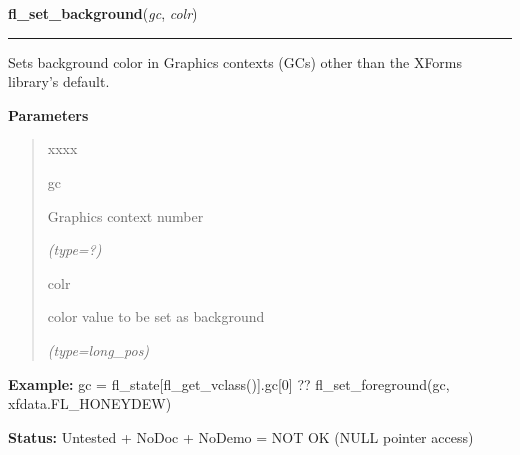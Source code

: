 \hspace{.8\funcindent}\begin{boxedminipage}{\funcwidth}

    \raggedright \textbf{fl\_set\_background}(\textit{gc}, \textit{colr})

    \vspace{-1.5ex}

    \rule{\textwidth}{0.5\fboxrule}
\setlength{\parskip}{2ex}
    Sets background color in Graphics contexts (GCs) other than the XForms 
    library's default.

\setlength{\parskip}{1ex}
      \textbf{Parameters}
      \vspace{-1ex}

      \begin{quote}
        \begin{Ventry}{xxxx}

          \item[gc]

          Graphics context number

            {\it (type=?)}

          \item[colr]

          color value to be set as background

            {\it (type=long\_pos)}

        \end{Ventry}

      \end{quote}

\textbf{Example:} gc = fl\_state[fl\_get\_vclass()].gc[0] ?? fl\_set\_foreground(gc, 
xfdata.FL\_HONEYDEW)



\textbf{Status:} Untested + NoDoc + NoDemo = NOT OK (NULL pointer access)



    \end{boxedminipage}

    \label{xformslib:flxbasic:fl_wincreate}

    \vspace{0.5ex}

